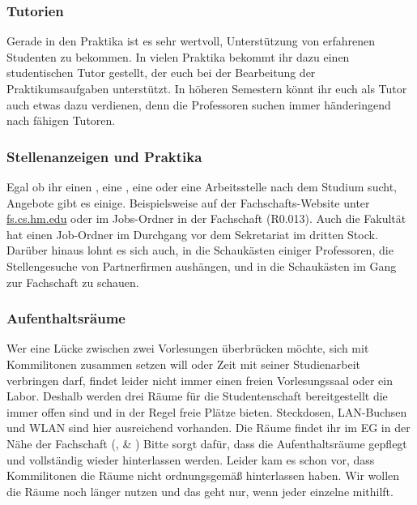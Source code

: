 \subsubsection{Tutorien}
Gerade in den Praktika ist es sehr wertvoll, Unterstützung von 
erfahrenen Studenten zu bekommen. In vielen Praktika bekommt ihr 
dazu einen studentischen Tutor gestellt, der euch bei der Bearbeitung 
der Praktikumsaufgaben unterstützt. \doublebreak
In höheren Semestern könnt ihr euch als Tutor auch etwas dazu 
verdienen, denn die Professoren suchen immer händeringend nach 
fähigen Tutoren. 

\subsubsection{Stellenanzeigen und Praktika}
Egal ob ihr einen , eine , 
eine  oder eine Arbeitsstelle nach dem 
Studium sucht, Angebote gibt es einige. Beispielsweise auf der 
Fachschafts-Website unter \url{fs.cs.hm.edu} \arrow {} \arrow {} oder im
Jobs-Ordner in der Fachschaft (R0.013). Auch die Fakultät hat einen Job-Ordner im Durchgang vor dem Sekretariat im dritten Stock. Darüber 
hinaus lohnt es sich auch, in die Schaukästen einiger Professoren, die Stellengesuche von Partnerfirmen aushängen, und in die Schaukästen im Gang zur Fachschaft zu schauen.

\subsubsection{Aufenthaltsräume}
Wer eine Lücke zwischen zwei Vorlesungen überbrücken möchte, sich mit Kommilitonen
zusammen setzen will oder Zeit mit seiner Studienarbeit verbringen darf, findet leider nicht
immer einen freien Vorlesungssaal oder ein Labor. 
Deshalb werden drei Räume für die Studentenschaft bereitgestellt die 
immer offen sind und in der Regel freie Plätze bieten. Steckdosen, LAN-Buchsen und WLAN sind hier ausreichend vorhanden. Die Räume findet 
ihr im EG in der Nähe der Fachschaft (,  \& )
Bitte sorgt dafür, dass die Aufenthaltsräume gepflegt und vollständig wieder hinterlassen werden.
Leider kam es schon vor, dass Kommilitonen die Räume nicht ordnungsgemäß hinterlassen haben.
Wir wollen die Räume noch länger nutzen und das geht nur, wenn jeder einzelne mithilft.